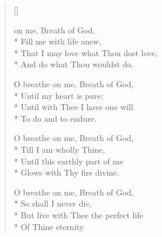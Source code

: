 \newHymn
{}

\begin{verse}[\versewidth]
\begin{altverse}
 on me, Breath of God,\\*
Fill me with life anew,\\*
That I may love what Thou dost love,\\*
And do what Thou wouldst do.
\end{altverse}

\begin{altverse}
 O breathe on me, Breath of God,\\*
Until my heart is pure:\\*
Until with Thee I have one will\\*
To do and to endure.
\end{altverse}

\begin{altverse}
 O breathe on me, Breath of God,\\*
Till I am wholly Thine,\\*
Until this earthly part of me\\*
Glows with Thy fire divine.
\end{altverse}

\begin{altverse}
 O breathe on me, Breath of God,\\*
So shall I never die,\\*
But live with Thee the perfect life\\*
Of Thine eternity
\end{altverse}

\end{verse}

  

